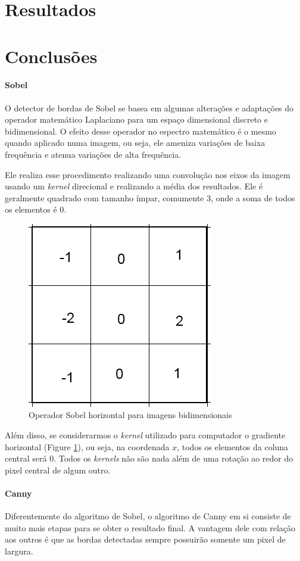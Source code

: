 \documentclass[10pt,twocolumn,letterpaper]{article}
\begin{document}
\section{Resultados}

\section{Conclusões}

\paragraph{Sobel}
O detector de bordas de Sobel se basea em algumas alterações e adaptações do operador matemático Laplaciano para um espaço dimensional discreto e bidimensional. O efeito desse operador no espectro matemático é o mesmo quando aplicado numa imagem, ou seja, ele ameniza variações de baixa frequência e atenua variações de alta frequência.\cite{sobel}

Ele realiza esse procedimento realizando uma convolução nos eixos da imagem usando um \emph{kernel} direcional e realizando a média dos resultados. Ele é geralmente quadrado com tamanho ímpar, comumente 3, onde a soma de todos os elementos é 0.

\begin{figure}[!htp]
\centering
\includegraphics[width=0.5\columnwidth]{SobelGx}
\caption{Operador Sobel horizontal para imagens bidimensionais}
\label{fig:SobelGx}
\end{figure}

Além disso, se considerarmos o \emph{kernel} utilizado para computador o gradiente horizontal (Figure \ref{fig:SobelGx}), ou seja, na coordenada $x$, todos os elementos da coluna central será 0. Todos os \emph{kernels} não são nada além de uma rotação ao redor do pixel central de algum outro.

\paragraph{Canny}
Diferentemente do algoritmo de Sobel, o algoritmo de Canny em si consiste de muito mais etapas para se obter o resultado final. A vantagem dele com relação aos outros é que as bordas detectadas sempre possuirão somente um pixel de largura.
\end{document}
